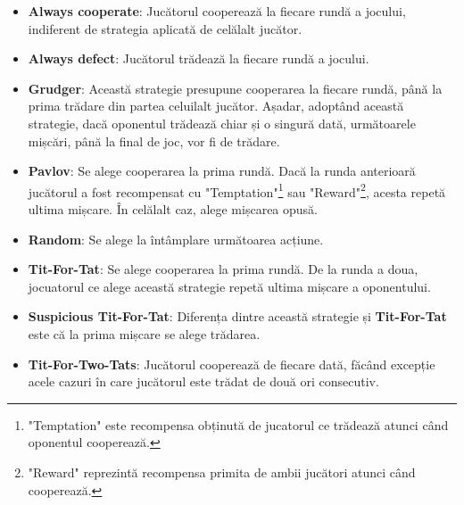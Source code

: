 \begin{itemize}  
	\item \textbf{Always cooperate}: Jucătorul cooperează la fiecare rundă a jocului, indiferent de strategia aplicată de celălalt jucător. 
	\item \textbf{Always defect}: Jucătorul trădează la fiecare rundă a jocului. 
	\item \textbf{Grudger}: Această strategie presupune cooperarea la fiecare rundă, până la prima trădare din partea celuilalt jucător. Așadar, adoptând această strategie, dacă oponentul trădează chiar și o singură dată, următoarele mișcări, până la final de joc, vor fi de trădare. 
	\item \textbf{Pavlov}: Se alege cooperarea la prima rundă. Dacă la runda anterioară jucătorul a fost recompensat cu "Temptation"\footnote{"Temptation" este recompensa obținută de jucatorul ce trădează atunci când oponentul cooperează.} sau "Reward"\footnote{"Reward" reprezintă recompensa primita de ambii jucători atunci când cooperează.}, acesta repetă ultima mișcare. În celălalt caz, alege mișcarea opusă. 
	\item \textbf{Random}: Se alege la întâmplare următoarea acțiune. 
	\item \textbf{Tit-For-Tat}: Se alege cooperarea la prima rundă. De la runda a doua, jocuatorul ce alege această strategie repetă ultima mișcare a oponentului. 
	\item \textbf{Suspicious Tit-For-Tat}: Diferența dintre această strategie și \textbf{Tit-For-Tat} este că la prima mișcare se alege trădarea. 
	\item \textbf{Tit-For-Two-Tats}:  Jucătorul cooperează de fiecare dată, făcând excepție acele cazuri în care jucătorul este trădat de două ori consecutiv. 
\end{itemize}  



